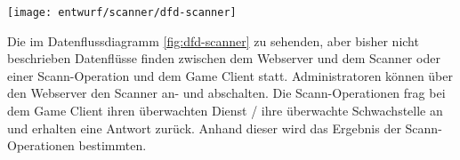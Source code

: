 \begin{center}
	\texttt{[image: entwurf/scanner/dfd-scanner]}
	\label{fig:dfd-scanner}
\end{center}

Die im Datenflussdiagramm \ref{fig:dfd-scanner} zu sehenden, aber bisher nicht beschrieben Datenflüsse finden zwischen dem Webserver und dem Scanner oder einer Scann-Operation und dem Game Client statt. Administratoren können über den Webserver den Scanner an- und abschalten. Die Scann-Operationen frag bei dem Game Client ihren überwachten Dienst / ihre überwachte Schwachstelle an und erhalten eine Antwort zurück. Anhand dieser wird das Ergebnis der Scann-Operationen bestimmten.